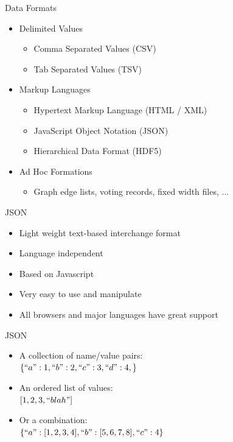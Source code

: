 \documentclass{beamer}
\begin{document}
\begin{frame}{Data Formats}
    \begin{itemize}
        \item Delimited Values
        \begin{itemize}
            \item Comma Separated Values (CSV)
            \item Tab Separated Values (TSV)
        \end{itemize}
        \item Markup Languages
        \begin{itemize}
            \item Hypertext Markup Language (HTML / XML)
            \item JavaScript Object Notation (JSON)
            \item Hierarchical Data Format (HDF5)
        \end{itemize}
        \item Ad Hoc Formations
        \begin{itemize}
            \item Graph edge lists, voting records, fixed width files, ...
        \end{itemize}
    \end{itemize}
\end{frame}


\begin{frame}{JSON}
    \begin{itemize}
        \item Light weight text-based interchange format
        \item Language independent 
        \item Based on Javascript
        \item Very easy to use and manipulate
        \item All browsers and major languages have great support
    \end{itemize}
\end{frame}


\begin{frame}{JSON}
    \begin{itemize}
        \item A collection of name/value pairs: \\ \qquad \qquad $\{``a":1, ``b":2,``c":3,``d":4,\}$
        \item An ordered list of values:\\ \qquad \qquad  $[1,2,3,``blah"]$
        \item Or a combination: \\ \qquad \qquad $\{ ``a": [1,2,3,4], ``b": [5,6,7,8], ``c": 4 \}$
    \end{itemize}
\end{frame}
\end{document}
